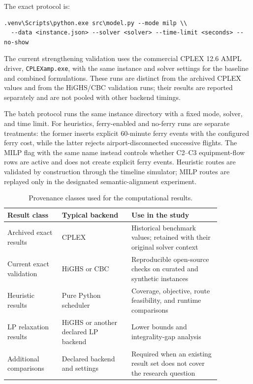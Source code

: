The exact protocol is:

\begin{verbatim}
.venv\Scripts\python.exe src\model.py --mode milp \\
  --data <instance.json> --solver <solver> --time-limit <seconds> --no-show
\end{verbatim}

The current strengthening validation uses the commercial CPLEX 12.6 AMPL
driver, \texttt{CPLEXamp.exe}, with the same instance and solver settings for
the baseline and combined formulations. These runs are distinct from the
archived CPLEX values and from the HiGHS/CBC validation runs; their results
are reported separately and are not pooled with other backend timings.

The batch protocol runs the same instance directory with a fixed mode, solver,
and time limit. For heuristics, ferry-enabled and no-ferry runs are separate
treatments: the former inserts explicit 60-minute ferry events with the
configured ferry cost, while the latter rejects airport-disconnected successive
flights. The MILP flag with the same name instead controls whether C2--C3
equipment-flow rows are active and does not create explicit ferry events.
Heuristic routes are validated by construction through the timeline simulator;
MILP routes are replayed only in the designated semantic-alignment experiment.

\begin{table}[t]
\centering\small
\caption{Provenance classes used for the computational results.}
\label{tab:computational_provenance}
\begin{tabular}{p{0.22\linewidth}p{0.28\linewidth}p{0.36\linewidth}}
\toprule
Result class & Typical backend & Use in the study \\
\midrule
Archived exact results & CPLEX & Historical benchmark values; retained with their original solver context \\
Current exact validation & HiGHS or CBC & Reproducible open-source checks on curated and synthetic instances \\
Heuristic results & Pure Python scheduler & Coverage, objective, route feasibility, and runtime comparisons \\
LP relaxation results & HiGHS or another declared LP backend & Lower bounds and integrality-gap analysis \\
Additional comparisons & Declared backend and settings & Required when an existing result set does not cover the research question \\
\bottomrule
\end{tabular}
\end{table}

